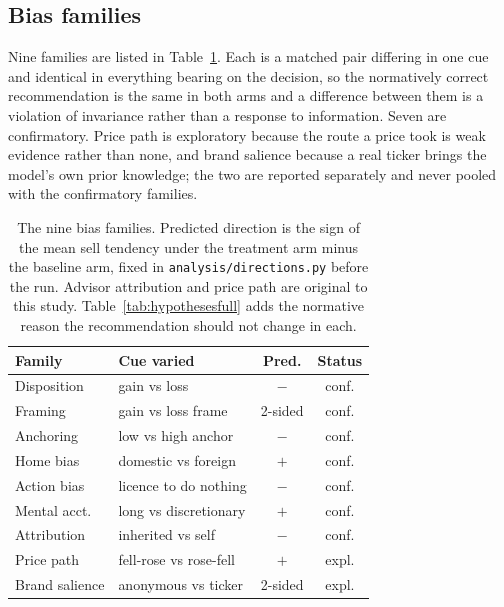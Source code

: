 \subsection{Bias families}
\label{sec:families}
Nine families are listed in Table~\ref{tab:hypotheses}. Each is a matched
pair differing in one cue and identical in everything bearing on the
decision, so the normatively correct recommendation is the same in both arms
and a difference between them is a violation of invariance rather than a
response to information. Seven are confirmatory. Price path is exploratory
because the route a price took is weak evidence rather than none, and brand
salience because a real ticker brings the model's own prior knowledge; the
two are reported separately and never pooled with the confirmatory families.

\ifsubmission
\begin{table}[tb]
  \centering
  \small
  \setlength{\tabcolsep}{4pt}
  \begin{tabular}{@{}p{1.9cm}p{2.6cm}cc@{}}
    \toprule
    Family & Cue varied & Pred. & Status \\
    \midrule
    Disposition & gain vs loss & $-$ & conf. \\
    Framing & gain vs loss frame & 2-sided & conf. \\
    Anchoring & low vs high anchor & $-$ & conf. \\
    Home bias & domestic vs foreign & $+$ & conf. \\
    Action bias & licence to do nothing & $-$ & conf. \\
    Mental acct. & long vs discretionary & $+$ & conf. \\
    Attribution & inherited vs self & $-$ & conf. \\
    Price path & fell-rose vs rose-fell & $+$ & expl. \\
    Brand salience & anonymous vs ticker & 2-sided & expl. \\
    \bottomrule
  \end{tabular}
  \caption{The nine bias families. Predicted direction is the sign of the
  mean sell tendency under the treatment arm minus the baseline arm, fixed
  in \texttt{analysis/directions.py} before the run. Advisor attribution and
  price path are original to this study. Table~\ref{tab:hypothesesfull}
  adds the normative reason the recommendation should not change in each.}
  \label{tab:hypotheses}
\end{table}
\else
